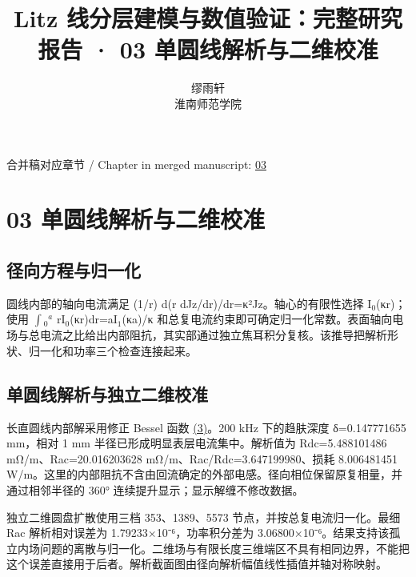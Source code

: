 \documentclass[11pt]{article}
\begin{document}
\title{Litz 线分层建模与数值验证：完整研究报告 · 03 单圆线解析与二维校准}
\author{缪雨轩\\淮南师范学院}
\date{}
\maketitle
\noindent 合并稿对应章节 / Chapter in merged manuscript: \href{report_zh-CN_single.pdf#chapter-03}{03}\par
\FloatBarrier
\section*{03 单圆线解析与二维校准}
\hypertarget{chapter-03}{}
\subsection*{径向方程与归一化}
\hypertarget{03.round_derivation.heading}{}
圆线内部的轴向电流满足 (1/r) d(r dJz/dr)/dr=κ²Jz。轴心的有限性选择 I\(_0\)(κr)；使用 \(\int\)\(_0\)\(^a\) rI\(_0\)(κr)dr=aI\(_1\)(κa)/κ 和总复电流约束即可确定归一化常数。表面轴向电场与总电流之比给出内部阻抗，其实部通过独立焦耳积分复核。该推导把解析形状、归一化和功率三个检查连接起来。


\subsection*{单圆线解析与独立二维校准}
\hypertarget{03.analytic.heading}{}
长直圆线内部解采用修正 Bessel 函数 \href{report_zh-CN_single.pdf#E03}{(3)}。200 kHz 下的趋肤深度 δ=0.147771655 mm，相对 1 mm 半径已形成明显表层电流集中。解析值为 Rdc=5.488101486 mΩ/m、Rac=20.016203628 mΩ/m、Rac/Rdc=3.647199980、损耗 8.006481451 W/m。这里的内部阻抗不含由回流确定的外部电感。径向相位保留原复相量，并通过相邻半径的 360° 连续提升显示；显示解缠不修改数据。


独立二维圆盘扩散使用三档 353、1389、5573 节点，并按总复电流归一化。最细 Rac 解析相对误差为 1.79233×10⁻⁶，功率积分差为 3.06800×10⁻⁶。结果支持该孤立内场问题的离散与归一化。二维场与有限长度三维端区不具有相同边界，不能把这个误差直接用于后者。解析截面图由径向解析幅值线性插值并轴对称映射。
\end{document}
